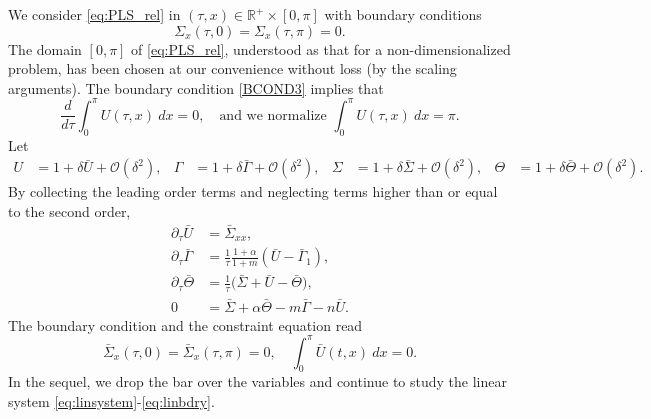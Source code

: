 \documentclass[a4paper,11pt]{article}
\theoremstyle{remark}
\begin{document}
{We consider \eqref{eq:PLS_rel}
in $(\tau,x)\in \mathbb{R}^+\times [0,\pi]$ with boundary conditions
\begin{equation} \label{BCOND3}
 \Sigma_x(\tau,0)=\Sigma_x(\tau,\pi)=0.
\end{equation}
The domain $[0,\pi]$ of \eqref{eq:PLS_rel}, understood as that for a non-dimensionalized problem, has been chosen at our convenience without loss (by the scaling arguments).
The boundary condition \eqref{BCOND3} implies that
\begin{equation*}
 \frac{d}{d\tau}\int_0^\pi U(\tau,x) \: dx = 0, \quad \text{and we normalize } \int_0^\pi U(\tau,x) \: dx = \pi.
\end{equation*}
Let
\begin{align*}
 U &= 1 + \delta \bar{U} + \mathcal{O}(\delta^2), & \Gamma &= 1 + \delta \bar\Gamma + \mathcal{O}(\delta^2), &
 \Sigma &= 1 + \delta \bar\Sigma + \mathcal{O}(\delta^2), & \Theta &= 1 + \delta \bar\Theta + \mathcal{O}(\delta^2).
\end{align*}
By collecting the leading order terms and neglecting terms higher than or equal to the second order,
\begin{equation} \label{eq:linsystem}
 \begin{aligned}
  \partial_\tau \bar U &= \bar\Sigma_{xx},\\
  \partial_\tau \bar\Gamma &= \frac{1}{\tau}\frac{1+\alpha}{1+m}(\bar U-\bar\Gamma_1),\\
  \partial_\tau \bar\Theta &= \frac{1}{\tau}\Big(\bar\Sigma+ \bar U -\bar\Theta\Big),\\ %
  0&=\bar\Sigma + \alpha\bar\Theta -m\bar\Gamma - n\bar U .
 \end{aligned}
\end{equation}
The boundary condition and the constraint equation read
\begin{equation} \label{eq:linbdry}
 \bar\Sigma_{x}(\tau,0)=\bar\Sigma_{x}(\tau,\pi)=0, \quad \int_0^\pi \bar U(t,x) \: dx = 0.
\end{equation}
In the sequel, we drop the bar over the variables and continue to study the linear system \eqref{eq:linsystem}-\eqref{eq:linbdry}.

}
\end{document}
